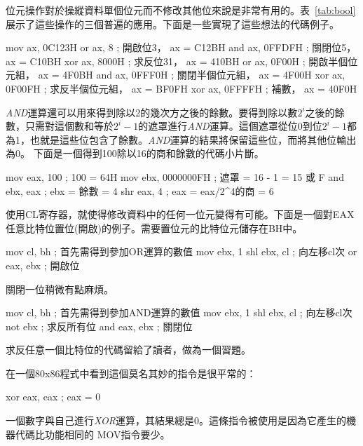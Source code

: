 位元操作對於操縱資料單個位元而不修改其他位來說是非常有用的。表~\ref{tab:bool}展示了這些操作的三個普遍的應用。下面是一些實現了這些想法的代碼例子。
\begin{AsmCodeListing}[frame=none]
      mov    ax, 0C123H
      or     ax, 8           ; 開啟位3，   ax = C12BH
      and    ax, 0FFDFH      ; 關閉位5，   ax = C10BH
      xor    ax, 8000H       ; 求反位31，    ax = 410BH
      or     ax, 0F00H       ; 開啟半個位元組，  ax = 4F0BH
      and    ax, 0FFF0H      ; 關閉半個位元組，  ax = 4F00H
      xor    ax, 0F00FH      ; 求反半個位元組，  ax = BF0FH
      xor    ax, 0FFFFH      ; 補數，   ax = 40F0H
\end{AsmCodeListing}

\emph{AND}運算還可以用來得到除以2的幾次方之後的餘數。要得到除以數$2^i$之後的餘數，只需對這個數和等於$2^i
- 1$的遮罩進行\emph{AND}運算。這個遮罩從位0到位$2^i -
1$都為1，也就是這些位包含了餘數。\emph{AND}運算的結果將保留這些位，而將其他位輸出為0。
下面是一個得到100除以16的商和餘數的代碼小片斷。
\begin{AsmCodeListing}[frame=none]
      mov    eax, 100        ; 100 = 64H
      mov    ebx, 0000000FH  ; 遮罩 = 16 - 1 = 15 或 F
      and    ebx, eax        ; ebx = 餘數 = 4
      shr    eax, 4          ; eax = eax/2^4的商 = 6
\end{AsmCodeListing}
使用{\code CL}寄存器，就使得修改資料中的任何一位元變得有可能。下面是一個對{\code EAX}任意比特位置位(開啟)的例子。需要置位元的比特位元儲存在{\code BH}中。
\begin{AsmCodeListing}[frame=none]
      mov    cl, bh          ; 首先需得到參加OR運算的數值
      mov    ebx, 1
      shl    ebx, cl         ; 向左移cl次
      or     eax, ebx        ; 開啟位
\end{AsmCodeListing}
關閉一位稍微有點麻煩。
\begin{AsmCodeListing}[frame=none]
      mov    cl, bh          ; 首先需得到參加AND運算的數值
      mov    ebx, 1
      shl    ebx, cl         ; 向左移cl次
      not    ebx             ; 求反所有位
      and    eax, ebx        ; 關閉位
\end{AsmCodeListing}
求反任意一個比特位的代碼留給了讀者，做為一個習題。

在一個80x86程式中看到這個莫名其妙的指令是很平常的：
\begin{AsmCodeListing}[frame=none,numbers=none]
      xor    eax, eax         ; eax = 0
\end{AsmCodeListing}
一個數字與自己進行\emph{XOR}運算，其結果總是0。這條指令被使用是因為它產生的機器代碼比功能相同的{\code
MOV}指令要少。 


